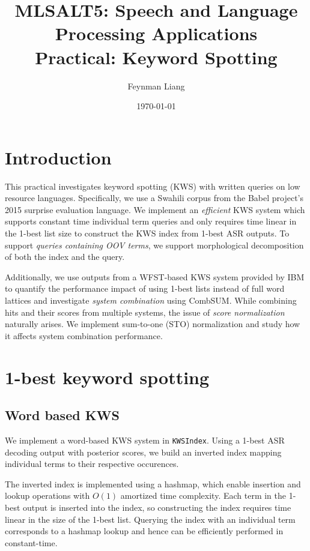 \documentclass[a4paper,oneside,reqno]{amsart}
\newcommand{\authorname}{Feynman Liang}
\newcommand{\coursename}{MLSALT5: Speech and Language Processing Applications}
\newcommand{\assignmentname}{Practical: Keyword Spotting}
\begin{document}
\title{\coursename\\\assignmentname}

\author{\authorname}
\date{\today}

\maketitle

\section{Introduction}

This practical investigates keyword spotting (KWS) with written queries on low
resource languages. Specifically, we use a Swahili corpus from the Babel
project's 2015 surprise evaluation language. We implement an \emph{efficient}
KWS system which supports constant time individual term queries and only
requires time linear in the 1-best list size to construct the KWS index from
1-best ASR outputs. To support \emph{queries containing OOV terms}, we support
morphological decomposition\cite{narasimhan2014morphological} of both the index
and the query.

Additionally, we use outputs from a WFST-based KWS system provided by
IBM\cite{gales2014speech} to quantify the performance impact of using 1-best
lists instead of full word lattices and investigate \emph{system combination}
using CombSUM\cite{lee1997analyses}.  While combining hits and their scores
from multiple systems, the issue of \emph{score normalization} naturally
arises. We implement sum-to-one (STO) normalization\cite{mamou2013system} and
study how it affects system combination performance.

\section{1-best keyword spotting}

\subsection{Word based KWS}

We implement a word-based KWS system in \texttt{KWSIndex}. Using a 1-best ASR
decoding output with posterior scores, we build an inverted index mapping
individual terms to their respective occurences.

The inverted index is implemented using a hashmap, which enable insertion and
lookup operations with $O(1)$ amortized time complexity. Each term in the
1-best output is inserted into the index, so constructing the index requires
time linear in the size of the 1-best list. Querying the index with an individual
term corresponds to a hashmap lookup and hence can be efficiently performed in
constant-time.
\end{document}
